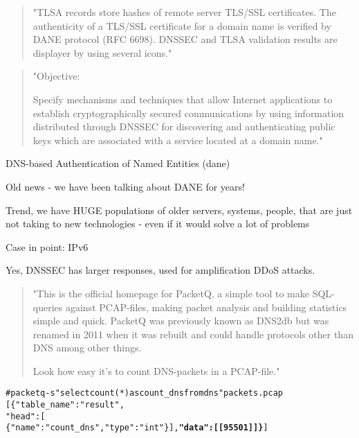 \documentclass[20pt,landscape,a4paper,footrule]{foils}
\begin{document}


\begin{quote}
"TLSA records store hashes of remote server TLS/SSL certificates. The authenticity of a TLS/SSL certificate for a domain name is verified by DANE protocol (RFC 6698). DNSSEC and TLSA validation results are displayer by using several icons."
\end{quote}



\begin{quote}
"Objective:

Specify mechanisms and techniques that allow Internet applications to
establish cryptographically secured communications by using information
distributed through DNSSEC for discovering and authenticating public
keys which are associated with a service located at a domain name."
\end{quote}

DNS-based Authentication of Named Entities (dane)

Old news - we have been talking about DANE for years!
\\
{\footnotesize {}}

Trend, we have HUGE populations of older servers, systems, people,
that are just not taking to new technologies - even if it would solve a lot of problems

Case in point: IPv6


Yes, DNSSEC has larger responses, used for amplification DDoS attacks.

\begin{quote}
"This is the official homepage for PacketQ, a simple tool to make SQL-queries against PCAP-files, making packet analysis and building statistics simple and quick. PacketQ was previously known as DNS2db but was renamed in 2011 when it was rebuilt and could handle protocols other than DNS among other things.

Look how easy it's to count DNS-packets in a PCAP-file."
\end{quote}

\begin{alltt}
\small
# packetq -s "select count(*) as count_dns from dns" packets.pcap
[ \{ "table_name": "result",
      "head": [
      \{ "name": "count_dns","type": "int" \} ],   {\bf "data": [ [95501] ] \}} ]
\end{alltt}
\end{document}
